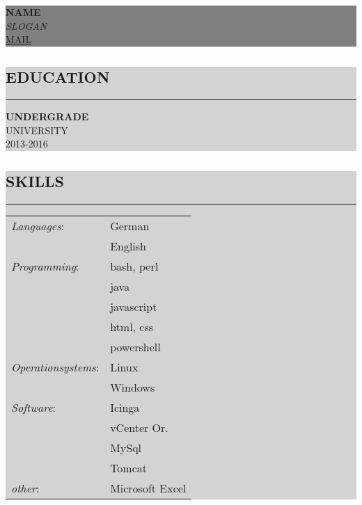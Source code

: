 \documentclass[12pt, a4paper, titlepage]{article}
\newcommand{\mybox}[2]{\par\noindent\colorbox{#1}
{\parbox{\dimexpr\textwidth-2\fboxsep\relax}{#2}}}
\begin{document}
\clearpage

\mybox{grey}{
	\begin{minipage}{.38\textwidth}
	\end{minipage}
	\begin{minipage}{.62\textwidth}
		\textbf{\huge NAME} \\ 
		\textit{\large SLOGAN} \\
		\href{mailto:mail@mail.mail}{MAIL}
	\end{minipage}
}
\begin{minipage}[t]{.38\textwidth}
	\vspace{0pt}
	\begin{flushleft}
		
		\mybox{lightGrey}{
			\subsection*{EDUCATION}
			\hrule
			\vskip2mm
			\textbf{UNDERGRADE} \\
			UNIVERSITY \\
			2013-2016
		}
		
		\mybox{lightGrey}{
		\subsection*{SKILLS}
		\hrule
		\vskip2mm
		\begin{tabular}{l l}
			\textit{Languages}: & German \\
			 & English \\
			\textit{Programming}: & bash, perl \\
			 & java \\
			 & javascript \\
			 & html, css \\
			 & powershell \\
			\textit{Operationsystems}: & Linux \\
			 & Windows \\
			\textit{Software}: & Icinga \\
			& vCenter Or. \\
			& MySql \\
			& Tomcat \\
			\textit{other}: & Microsoft Excel \\
		\end{tabular}
		}
		
	\end{flushleft} 
\end{minipage}
\end{document}
